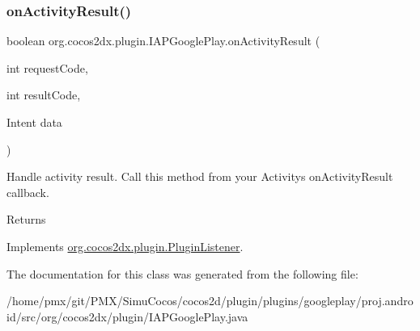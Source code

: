 \subsubsection{\texorpdfstring{on\+Activity\+Result()}{onActivityResult()}}
{\footnotesize\ttfamily boolean org.\+cocos2dx.\+plugin.\+I\+A\+P\+Google\+Play.\+on\+Activity\+Result (\begin{DoxyParamCaption}\item[{int}]{request\+Code,  }\item[{int}]{result\+Code,  }\item[{Intent}]{data }\end{DoxyParamCaption})\hspace{0.3cm}{\ttfamily [inline]}}

Handle activity result. Call this method from your Activity\textquotesingle{}s on\+Activity\+Result callback. \begin{DoxyReturn}{Returns}

\end{DoxyReturn}


Implements \hyperlink{interfaceorg_1_1cocos2dx_1_1plugin_1_1PluginListener}{org.\+cocos2dx.\+plugin.\+Plugin\+Listener}.



The documentation for this class was generated from the following file\+:\begin{DoxyCompactItemize}
\item 
/home/pmx/git/\+P\+M\+X/\+Simu\+Cocos/cocos2d/plugin/plugins/googleplay/proj.\+android/src/org/cocos2dx/plugin/I\+A\+P\+Google\+Play.\+java\end{DoxyCompactItemize}

